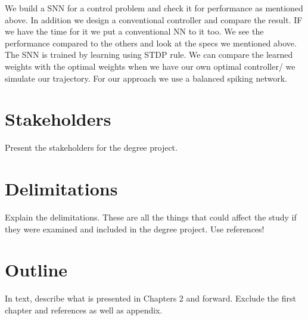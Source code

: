 We build a SNN for a control problem and check it for performance as mentioned above. In addition we design a conventional controller and compare the result. IF we have the time for it we put a conventional NN to it too. We see the performance compared to the others and look at the specs we mentioned above.
The SNN is trained by learning using STDP rule. We can compare the learned weights with the optimal weights when we have our own optimal controller/ we simulate our trajectory.
For our approach we use a balanced spiking network.
\section{Stakeholders}
Present the stakeholders for the degree project.

\section{Delimitations}
Explain the delimitations. These are all the things that could affect the study if they were examined and included in the degree project.
Use references!

\section{Outline}
In text, describe what is presented in Chapters 2 and forward. Exclude the first chapter and references as well as appendix.
